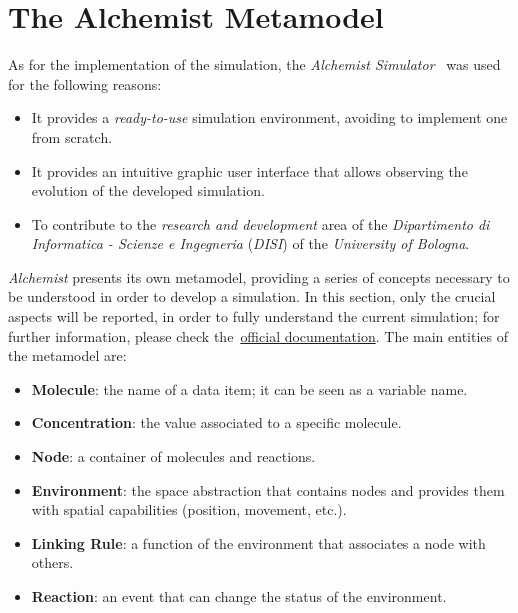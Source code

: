 \section{The Alchemist Metamodel}\label{sec:the-alchemist-metamodel}

As for the implementation of the simulation, the \textit{Alchemist Simulator}~\cite{Pianini_2013} was used for the following reasons:
\begin{itemize}
    \item It provides a \textit{ready-to-use} simulation environment, avoiding to implement one from scratch.
    \item It provides an intuitive graphic user interface that allows observing the evolution of the developed simulation.
    \item To contribute to the \textit{research and development} area of the \textit{Dipartimento di Informatica - Scienze e Ingegneria} (\textit{DISI}) of the \textit{University of Bologna}.
\end{itemize}

\noindent
\textit{Alchemist} presents its own metamodel, providing a series of concepts necessary to be understood in order to develop a simulation.
In this section, only the crucial aspects will be reported, in order to fully understand the current simulation; for further information, please check the~\href{https://alchemistsimulator.github.io/}{official documentation}.
The main entities of the metamodel are:
\begin{itemize}
    \item \textbf{Molecule}: the name of a data item; it can be seen as a variable name.
    \item \textbf{Concentration}: the value associated to a specific molecule.
    \item \textbf{Node}: a container of molecules and reactions.
    \item \textbf{Environment}: the space abstraction that contains nodes and provides them with spatial capabilities (position, movement, etc.).
    \item \textbf{Linking Rule}: a function of the environment that associates a node with others.
    \item \textbf{Reaction}: an event that can change the status of the environment.
\end{itemize}

